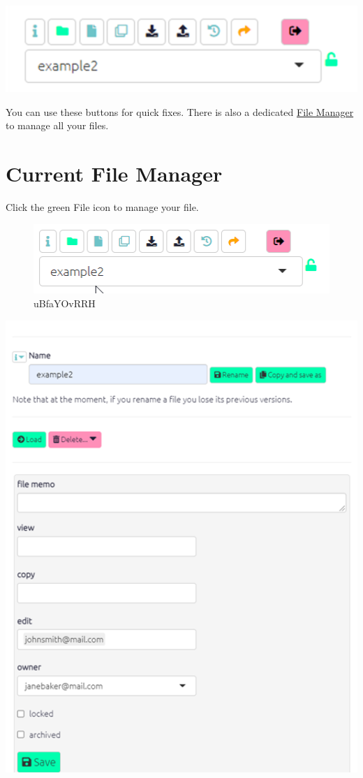 \documentclass[
]{book}
\begin{document}
\includegraphics[width=6.77083in,height=\textheight]{_assets/image-20211025111815970.png}

You can use these buttons for quick fixes. There is also a dedicated \protect\hyperlink{file-manager}{File Manager} to manage all your files.

\hypertarget{xpermissions}{%
\section{Current File Manager}\label{xpermissions}}

Click the green File icon to manage your file.

\begin{figure}
\centering
\includegraphics[width=6.77083in,height=\textheight]{_assets/uBfaYOvRRH.gif}
\caption{uBfaYOvRRH}
\end{figure}

\includegraphics[width=6.77083in,height=\textheight]{_assets/image-20211025111538915.png}
\end{document}

